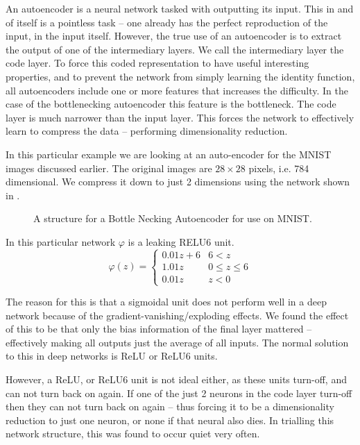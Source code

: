 \documentclass[12pt,parskip]{komatufte}
\begin{document}
An autoencoder is a neural network tasked with outputting its input.
This in and of itself is a pointless task -- one already has the perfect reproduction of the input, in the input itself.
However, the true use of an autoencoder is to extract the output of one of the intermediary layers.
We call the intermediary layer the code layer.
To force this coded representation to have useful interesting properties,
and to prevent the network from simply learning the identity function,
all autoencoders include one or more features that increases the difficulty.
In the case of the bottlenecking autoencoder this feature is the bottleneck.
The code layer is much narrower than the input layer.
This forces the network to effectively learn to compress the data -- performing dimensionality reduction.

In this particular example we are looking at an auto-encoder for the MNIST images discussed earlier.
The original images are $28 \times 28$ pixels, i.e. 784 dimensional.
We compress it down to just 2 dimensions using the network shown in .

\begin{figure}
	\caption{A structure for a Bottle Necking Autoencoder for use on MNIST.}
	\label{fig-autoencoder}
	
\end{figure}


In this particular network $\varphi$ is a leaking RELU6 unit.
\begin{equation}
\varphi(z)=\begin{cases}
    0.01z+6 & 6<z \\
	1.01z & 0 \le z \le 6 \\
	0.01z & z < 0
\end{cases}
\end{equation}

The reason for this is that a sigmoidal unit does not perform well in a deep network because of the gradient-vanishing/exploding effects.
We found the effect of this to be that only the bias information of the final layer mattered -- effectively making all outputs just the average of all inputs.
The normal solution to this in deep networks is ReLU or ReLU6 units.

However, a ReLU, or ReLU6 unit is not ideal either,
as these units turn-off, and can not turn back on again.
If one of the just 2 neurons in the code layer turn-off then they can not turn back on again -- thus forcing it to be a dimensionality reduction to just one neuron, or none if that neural also dies.
In trialling this network structure, this was found to occur quiet very often.
\end{document}
